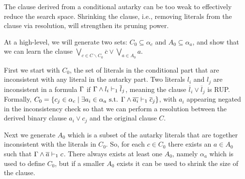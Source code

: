 The \pr clause derived from a conditional autarky can be too weak to effectively
reduce the search space.
Shrinking the \pr clause, i.e., removing literals from the clause via
resolution, will strengthen its pruning power. 

At a high-level, we will generate two sets: $C_0 \subseteq \alpha_c$ and $A_0
\subseteq \alpha_a$, and show that we can learn the \pr clause $\bigvee_{c \in C
\backslash C_0} \overline{c} \lor \bigvee_{a \in A_0} a$. 

First we start with $C_0$, the set of literals in the conditional part that are
inconsistent with any literal in the autarky part. Two literals $l_i$ and $l_j$
are inconsistent in a formula $\Gamma$ if
$\Gamma \land l_i \vdash_1 \overline{l}_j$, meaning the clause
$\overline{l}_i \lor \overline{l}_j$ is RUP. Formally, $C_0 = \{c_j \in \alpha_c
\mid \exists a_i \in \alpha_a \text{ s.t. }
\Gamma \land \overline{a_i} \vdash_1 \overline{c}_j \}$, with $a_i$ appearing negated
in the inconsistency check so that we can perform a resolution between the
derived binary clause  $a_i \lor c_j$ and the original \pr clause $C$.

Next we generate $A_0$ which is a subset of the autarky literals that are
together inconsistent with the literals in $C_0$. So, for each $c \in C_0$ there
exists an $a \in A_0$ such that $\Gamma \land \overline{a} \vdash_1 c$. There always
exists at least one $A_0$, namely $\alpha_a$ which is used to define $C_0$, but
if a smaller $A_0$ exists it can be used to shrink the size of the \pr clause. 


